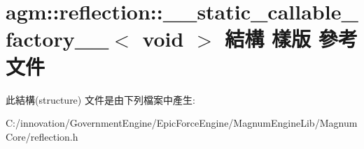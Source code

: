 \hypertarget{structagm_1_1reflection_1_1____static__callable__factory_____3_01void_01_4}{}\section{agm\+:\+:reflection\+:\+:\+\_\+\+\_\+static\+\_\+callable\+\_\+factory\+\_\+\+\_\+$<$ void $>$ 結構 樣版 參考文件}
\label{structagm_1_1reflection_1_1____static__callable__factory_____3_01void_01_4}


此結構(structure) 文件是由下列檔案中產生\+:\begin{DoxyCompactItemize}
\item 
C\+:/innovation/\+Government\+Engine/\+Epic\+Force\+Engine/\+Magnum\+Engine\+Lib/\+Magnum\+Core/reflection.\+h\end{DoxyCompactItemize}
